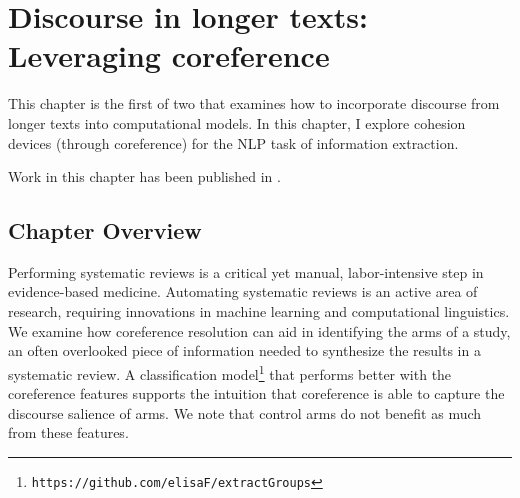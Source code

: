\chapter{Discourse in longer texts: Leveraging coreference}
\label{ch:longertexts1}
This chapter is the first of two that examines how to incorporate discourse from longer texts into computational models. In this chapter, I explore cohesion devices (through coreference) for the NLP task of information extraction.

Work in this chapter has been published in .

\section{Chapter Overview}
Performing systematic reviews is a critical yet manual, labor-intensive step in evidence-based medicine. Automating systematic reviews is an active area of research, requiring innovations in machine learning and computational linguistics. We examine how coreference resolution can aid in identifying the arms of a study, an often overlooked piece of information needed to synthesize the results in a systematic review. A classification model\footnote{\tt https://github.com/elisaF/extractGroups} that performs better with the coreference features supports the intuition that coreference is able to capture the discourse salience of arms. We note that control arms do not benefit as much from these features. 


